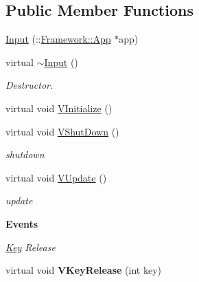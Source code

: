 \subsection*{Public Member Functions}
\begin{Indent}{\bf }\par
{\em \label{_amgrpd41d8cd98f00b204e9800998ecf8427e}
 }\begin{DoxyCompactItemize}
\item 
\hyperlink{classPlatform_1_1Input_a6c2cb78acadfb023bbf1b4646423d87e}{Input} (::\hyperlink{classFramework_1_1App}{Framework::App} $\ast$app)
\item 
\hypertarget{classPlatform_1_1Input_a6a69fa2bf18b4c2ddcd74d8fd3f25664}{
virtual \hyperlink{classPlatform_1_1Input_a6a69fa2bf18b4c2ddcd74d8fd3f25664}{$\sim$Input} ()}
\label{classPlatform_1_1Input_a6a69fa2bf18b4c2ddcd74d8fd3f25664}

\begin{DoxyCompactList}\small\item\em Destructor. \item\end{DoxyCompactList}\item 
virtual void \hyperlink{classPlatform_1_1Input_acc69f9603dbb49644d2c6f4653f4b64f}{VInitialize} ()
\item 
\hypertarget{classPlatform_1_1Input_a9e21183c5bc0d0e2591f0162bf79e601}{
virtual void \hyperlink{classPlatform_1_1Input_a9e21183c5bc0d0e2591f0162bf79e601}{VShutDown} ()}
\label{classPlatform_1_1Input_a9e21183c5bc0d0e2591f0162bf79e601}

\begin{DoxyCompactList}\small\item\em shutdown \item\end{DoxyCompactList}\item 
\hypertarget{classPlatform_1_1Input_a4bf1d659a104f1137ef11e9a1eed3185}{
virtual void \hyperlink{classPlatform_1_1Input_a4bf1d659a104f1137ef11e9a1eed3185}{VUpdate} ()}
\label{classPlatform_1_1Input_a4bf1d659a104f1137ef11e9a1eed3185}

\begin{DoxyCompactList}\small\item\em update \item\end{DoxyCompactList}\end{DoxyCompactItemize}
\end{Indent}
\begin{Indent}{\bf Events}\par
{\em \label{_amgrp87f9f735a1d36793ceaecd4e47124b63}
 \hyperlink{structPlatform_1_1Key}{Key} Release }\begin{DoxyCompactItemize}
\item 
\hypertarget{classPlatform_1_1Input_a601c6faa7295569472ecb0c3da51c142}{
virtual void {\bfseries VKeyRelease} (int key)}
\label{classPlatform_1_1Input_a601c6faa7295569472ecb0c3da51c142}

\end{DoxyCompactItemize}
\end{Indent}

